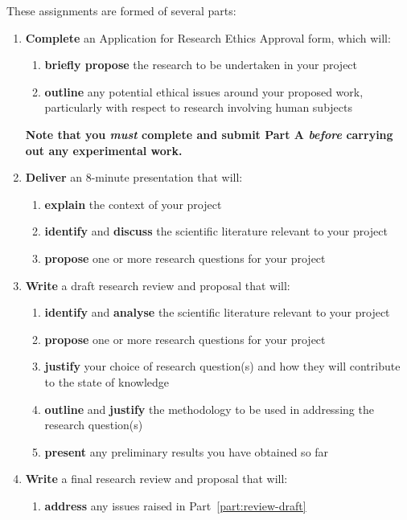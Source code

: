 These assignments are formed of several parts:
\begin{enumerate}[label=(\Alph*)]
	\item \textbf{Complete} an Application for Research Ethics Approval form,
		which will:
		\begin{enumerate}[label=(\roman*)]
			\item \textbf{briefly propose} the research to be undertaken in your project
			\item \textbf{outline} any potential ethical issues around your proposed work,
				particularly with respect to research involving human subjects
		\end{enumerate}
		\textbf{Note that you \textit{must} complete and submit Part A
		\textit{before} carrying out any experimental work.}
	\item \textbf{Deliver} an 8-minute presentation that will:
		\begin{enumerate}[label=(\roman*)]
			\item \textbf{explain} the context of your project
			\item \textbf{identify} and \textbf{discuss} the scientific literature
				relevant to your project
			\item \textbf{propose} one or more research questions for your project
		\end{enumerate}
	\item \label{part:review-draft} \textbf{Write} a draft research review and proposal
		that will:
		\begin{enumerate}[label=(\roman*)]
			\item \textbf{identify} and \textbf{analyse} the scientific literature
				relevant to your project
			\item \textbf{propose} one or more research questions for your project
			\item \textbf{justify} your choice of research question(s)
				and how they will contribute to the state of knowledge
			\item \textbf{outline} and \textbf{justify} the methodology to be used
				in addressing the research question(s)
			\item \textbf{present} any preliminary results you have obtained so far
		\end{enumerate}
	\item \textbf{Write} a final research review and proposal that will:
		\begin{enumerate}[label=(\roman*)]
			\item \textbf{address} any issues raised in Part~\ref{part:review-draft}

\end{enumerate}
\end{enumerate}

